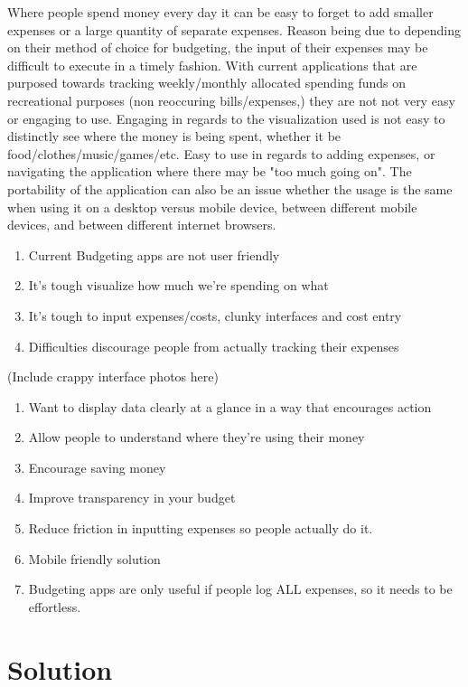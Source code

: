 \documentclass{chi2011}
\begin{document}
Where people spend money every day it can be easy to forget to add smaller expenses or a large quantity of separate 
expenses. Reason being due to depending on their method of choice for budgeting, the input of their expenses may be 
difficult to execute in a timely fashion. With current applications that are purposed towards tracking 
weekly/monthly allocated spending funds on recreational purposes (non reoccuring bills/expenses,) they are not not 
very easy or engaging to use. Engaging in regards to the visualization used is not easy to distinctly see where the 
money is being spent, whether it be food/clothes/music/games/etc. Easy to use in regards to adding expenses, or navigating 
the application where there may be "too much going on". The portability of the application can also be an issue whether the 
usage is the same when using it on a desktop versus mobile device, between different mobile devices, and between different 
internet browsers. 



\begin{enumerate}
    \item Current Budgeting apps are not user friendly
    \item It's tough visualize how much we're spending on what
    \item It's tough to input expenses/costs, clunky interfaces and cost entry
    \item Difficulties discourage people from actually tracking their expenses
\end{enumerate}

(Include crappy interface photos here)

\begin{enumerate}
\item Want to display data clearly at a glance in a way that encourages action
\item Allow people to understand where they're using their money
\item Encourage saving money
\item Improve transparency in your budget
\item Reduce friction in inputting expenses so people actually do it.
\item Mobile friendly solution
\item Budgeting apps are only useful if people log ALL expenses, so it needs to be effortless.
\end{enumerate}

\section{Solution}
\end{document}
